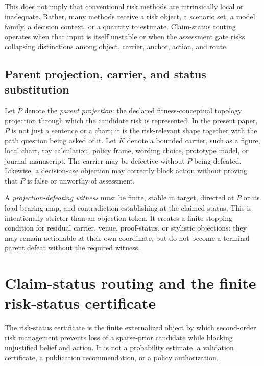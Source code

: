 \documentclass[11pt]{article}
\begin{document}
This does not imply that conventional risk methods are intrinsically local or inadequate. Rather, many methods receive a risk object, a scenario set, a model family, a decision context, or a quantity to estimate. Claim-status routing operates when that input is itself unstable or when the assessment gate risks collapsing distinctions among object, carrier, anchor, action, and route.

\subsection{Parent projection, carrier, and status substitution}

Let $P$ denote the \emph{parent projection}: the declared fitness-conceptual topology projection through which the candidate risk is represented. In the present paper, $P$ is not just a sentence or a chart; it is the risk-relevant shape together with the path question being asked of it. Let $K$ denote a bounded carrier, such as a figure, local chart, toy calculation, policy frame, wording choice, prototype model, or journal manuscript. The carrier may be defective without $P$ being defeated. Likewise, a decision-use objection may correctly block action without proving that $P$ is false or unworthy of assessment.

A \emph{projection-defeating witness} must be finite, stable in target, directed at $P$ or its load-bearing map, and contradiction-establishing at the claimed status. This is intentionally stricter than an objection token. It creates a finite stopping condition for residual carrier, venue, proof-status, or stylistic objections: they may remain actionable at their own coordinate, but do not become a terminal parent defeat without the required witness.

\section{Claim-status routing and the finite risk-status certificate}
\label{sec:certificate}

The risk-status certificate is the finite externalized object by which second-order risk management prevents loss of a sparse-prior candidate while blocking unjustified belief and action. It is not a probability estimate, a validation certificate, a publication recommendation, or a policy authorization.
\end{document}
